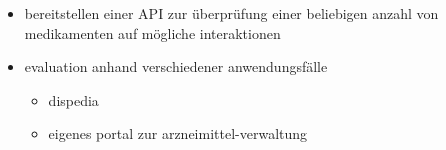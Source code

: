 \begin{itemize}
\item bereitstellen einer API zur überprüfung einer beliebigen anzahl von medikamenten auf mögliche interaktionen
\item evaluation anhand verschiedener anwendungsfälle
\begin{itemize}
\item dispedia
\item eigenes portal zur arzneimittel-verwaltung
\end{itemize}
\end{itemize}

